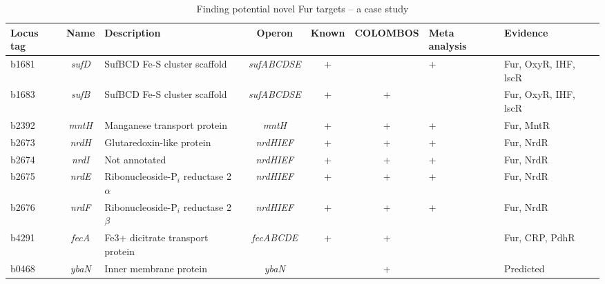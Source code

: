 \begin{sidewaystable}
\centering
\caption{Finding potential novel Fur targets – a case study}
\label{tab:colTB-case}
\begin{scriptsize}
\begin{tabular}{ l c >{\raggedright}p{4cm} c c c 
>{\centering\arraybackslash}p{1.2cm} >{\raggedright\arraybackslash}p{4cm} }
	\toprule
	\textbf{{\scriptsize Locus tag}} & \textbf{{\scriptsize Name}} & 
	\textbf{{\scriptsize Description}} & \textbf{{\scriptsize Operon}} & 
	\textbf{{\scriptsize Known}} & \textbf{{\scriptsize COLOMBOS}} & 
	\textbf{{\scriptsize Meta analysis}} & \textbf{{\scriptsize Evidence}} \\
	\midrule
	
	b1681 & \textit{sufD} & SufBCD Fe-S cluster scaffold & \textit{sufABCDSE} & 
	+ &		& + & Fur, OxyR, IHF, lscR \\[1ex]
	
	b1683 & \textit{sufB} & SufBCD Fe-S cluster scaffold & \textit{sufABCDSE} & 
	+ & + 	& 	& Fur, OxyR, IHF, lscR \\[1ex]
	
	b2392 & \textit{mntH} & Manganese transport protein & \textit{mntH} & 
	+ & + 	& + & Fur, MntR \\[1ex]
	
	b2673 & \textit{nrdH} & Glutaredoxin-like protein 	& \textit{nrdHIEF} &
	+ & + 	& + & Fur, NrdR \\[1ex]
	
	b2674 & \textit{nrdI} & Not annotated 				& \textit{nrdHIEF} & 
	+ & + 	& + & Fur, NrdR \\[1ex]
	
	b2675 & \textit{nrdE} & Ribonucleoside-P$_i$ reductase 2 $\alpha$ & 
	\textit{nrdHIEF} & 
	+ & + 	& + & Fur, NrdR \\[1ex]
	
	b2676 & \textit{nrdF} & Ribonucleoside-P$_i$ reductase 2 $\beta$ & 
	\textit{nrdHIEF} & 
	+ & + 	& + & Fur, NrdR \\[1ex]
	
	b4291 & \textit{fecA} & Fe3+ dicitrate transport protein & 
	\textit{fecABCDE} & 
	+ & + 	& 	& Fur, CRP, PdhR \\[1ex]
	
	b0468 & \textit{ybaN} & Inner membrane protein 		& \textit{ybaN} & 
	  & + 	& 	& Predicted \\[1ex]
	  

\end{tabular}
\end{scriptsize}
\end{sidewaystable}
